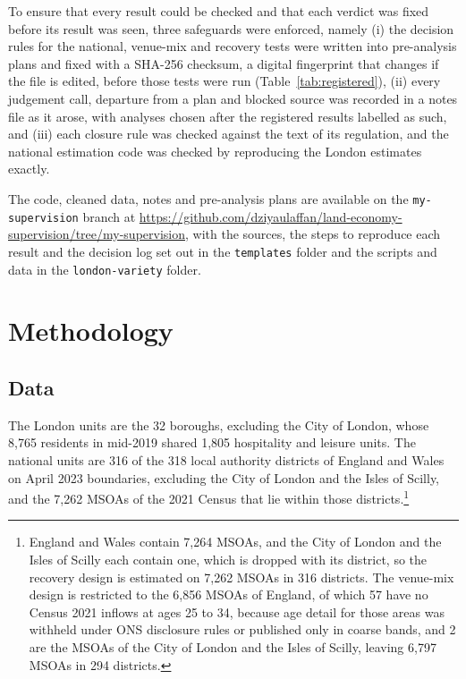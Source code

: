 \documentclass[11pt,a4paper]{article}
\begin{document}
To ensure that every result could be checked and that each verdict was fixed before its result was seen, three safeguards were enforced, namely (i) the decision rules for the national, venue-mix and recovery tests were written into pre-analysis plans and fixed with a SHA-256 checksum, a digital fingerprint that changes if the file is edited, before those tests were run (Table~\ref{tab:registered}), (ii) every judgement call, departure from a plan and blocked source was recorded in a notes file as it arose, with analyses chosen after the registered results labelled as such, and (iii) each closure rule was checked against the text of its regulation, and the national estimation code was checked by reproducing the London estimates exactly.

The code, cleaned data, notes and pre-analysis plans are available on the \texttt{my-supervision} branch at \url{https://github.com/dziyaulaffan/land-economy-supervision/tree/my-supervision}, with the sources, the steps to reproduce each result and the decision log set out in the \texttt{templates} folder and the scripts and data in the \texttt{london-variety} folder.
\section{Methodology}

\subsection{Data}

The London units are the 32 boroughs, excluding the City of London, whose 8,765 residents in mid-2019 shared 1,805 hospitality and leisure units. The national units are 316 of the 318 local authority districts of England and Wales on April 2023 boundaries, excluding the City of London and the Isles of Scilly, and the 7,262 MSOAs of the 2021 Census that lie within those districts.\footnote{England and Wales contain 7,264 MSOAs, and the City of London and the Isles of Scilly each contain one, which is dropped with its district, so the recovery design is estimated on 7,262 MSOAs in 316 districts. The venue-mix design is restricted to the 6,856 MSOAs of England, of which 57 have no Census 2021 inflows at ages 25 to 34, because age detail for those areas was withheld under ONS disclosure rules or published only in coarse bands, and 2 are the MSOAs of the City of London and the Isles of Scilly, leaving 6,797 MSOAs in 294 districts.}
\end{document}

